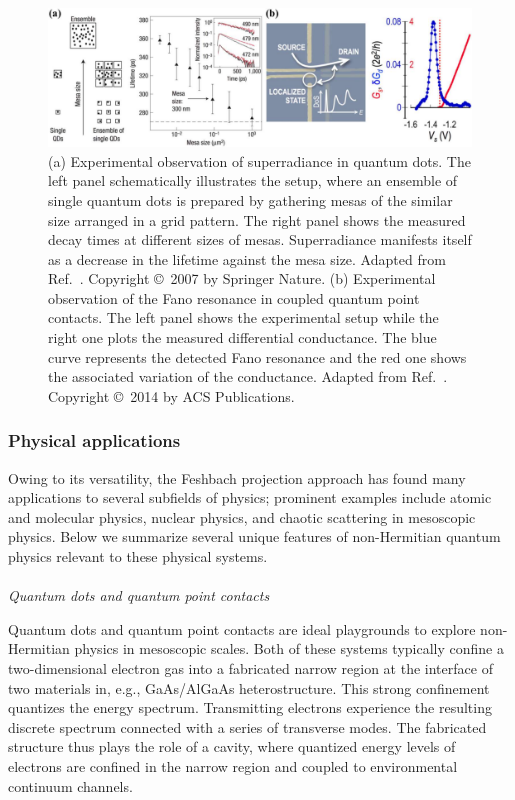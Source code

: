 \documentclass{tADP2e}
\theoremstyle{plain}
\theoremstyle{plain}
\theoremstyle{definition}
\begin{document}
\begin{figure}[t]
\begin{center}
\includegraphics[width=13cm]{./Figures/fig_4_dot.pdf}
\end{center}
\caption{(a) Experimental observation of superradiance in quantum dots. The left panel schematically illustrates the setup, where an ensemble of single quantum dots is prepared by gathering mesas of the similar size  arranged in a grid pattern. The right panel shows the measured decay times at different sizes of mesas. Superradiance manifests itself as a decrease in the lifetime against the mesa size. 
Adapted from Ref.~\cite{SM07}. Copyright \copyright\,   2007 by Springer Nature. (b) Experimental observation of the Fano resonance in coupled quantum point contacts. The left panel shows the experimental setup while the right one plots the measured differential conductance. The blue curve represents the detected Fano resonance and the red one shows the associated variation of the conductance. Adapted from Ref.~\cite{FJ14}. Copyright \copyright\,   2014 by ACS Publications.  }
\label{fig:4dot}
\end{figure}

\subsubsection{Physical applications}\label{Sec:4pa}
Owing to its versatility, the Feshbach projection approach has found many applications to several subfields of physics; prominent examples include  atomic and molecular physics,  nuclear physics, and chaotic scattering in mesoscopic physics. Below we summarize several unique features of non-Hermitian quantum physics relevant to these physical systems.
\\ \\ {\it Quantum dots and quantum point contacts}

\vspace{3pt}
\noindent
Quantum dots and quantum point contacts are ideal playgrounds to explore non-Hermitian physics in mesoscopic scales. Both of these systems typically confine a two-dimensional electron gas  into a fabricated narrow region at the interface of two materials in, e.g., GaAs/AlGaAs heterostructure.  
This strong confinement quantizes the energy spectrum. Transmitting electrons experience the resulting discrete spectrum connected with a series of transverse modes. The fabricated structure thus plays the role of a cavity, where quantized energy levels of electrons are confined in the narrow region and coupled to environmental continuum channels. 
\end{document}
